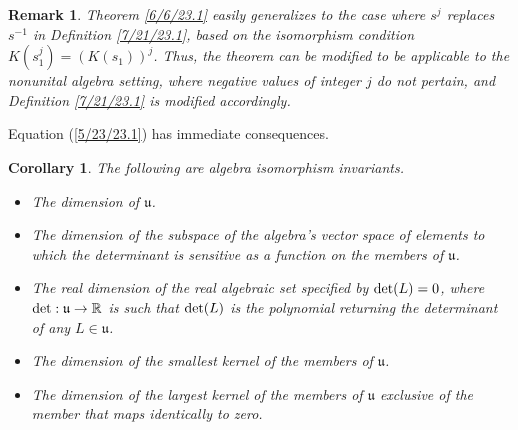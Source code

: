 \documentclass{amsart}
\numberwithin{equation}{section}
\newtheorem{remark}[theorem]{Remark}
\newtheorem{corollary}[theorem]{Corollary}
\theoremstyle{definition}
\numberwithin{theorem}{section}
\begin{document}
\begin{remark} \label{9/18/23.1} {\rm Theorem \ref{6/6/23.1} easily generalizes to the case where $s^j$ replaces $s^{-1}$ in Definition \ref{7/21/23.1}, based on the isomorphism condition $K(s_1^j) = (K(s_1))^j$. Thus, the theorem can be modified to be applicable to the nonunital algebra setting, where negative values of integer $j$ do not pertain, and Definition \ref{7/21/23.1} is modified accordingly.  } \end{remark}

    Equation (\ref{5/23/23.1}) has immediate consequences.
    
   
    \newpage
  
  \begin{corollary}\label{8/18/23.2} The following are algebra isomorphism invariants. \begin{itemize} \item The dimension of $\mathfrak{u}$. \item The dimension of the subspace of the algebra's vector space of elements to which the determinant is sensitive as a function on the members of $\mathfrak{u}$. \item The real dimension of the real algebraic set specified by ${\rm det}(L) =0$, where ${\rm det}:\mathfrak{u}\rightarrow \mathbb{R}$ is such that ${\rm det}(L)$ is the polynomial returning the determinant of any $L\in\mathfrak{u}$.  \item The dimension of the smallest kernel of the members of $\mathfrak{u}$.  \item The dimension of the largest kernel of the members of $\mathfrak{u}$ exclusive of the member that maps identically to zero.\end{itemize} \end{corollary}
\end{document}
